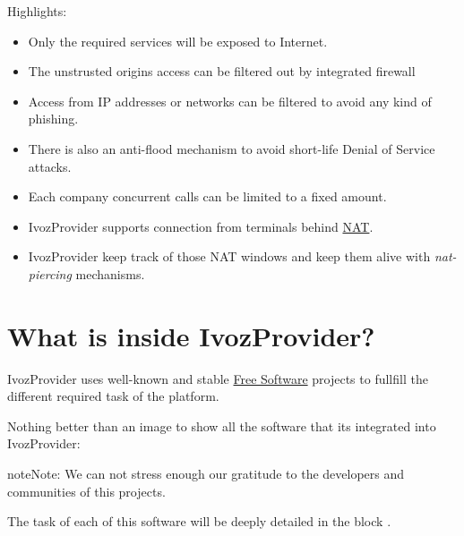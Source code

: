 \documentclass[letterpaper,10pt,english]{sphinxmanual}
\begin{document}
Highlights:
\begin{itemize}
\item {} 
Only the required services will be exposed to Internet.

\item {} 
The unstrusted origins access can be filtered out by integrated firewall

\item {} 
Access from IP addresses or networks can be filtered to avoid any kind of
phishing.

\item {} 
There is also an anti-flood mechanism to avoid short-life Denial of
Service attacks.

\item {} 
Each company concurrent calls can be limited to a fixed amount.

\item {} 
IvozProvider supports connection from terminals behind
\href{https://es.wikipedia.org/wiki/Traducci\%C3\%B3n\_de\_direcciones\_de\_red}{NAT}.

\item {} 
IvozProvider keep track of those NAT windows and keep them alive with
\emph{nat-piercing} mechanisms.

\end{itemize}


\section{What is inside IvozProvider?}
\label{basics/intro/what_is_inside::doc}\label{basics/intro/what_is_inside:what-is-inside-ivozprovider}
IvozProvider uses well-known and stable \href{https://www.gnu.org/philosophy/free-sw.en.html}{Free Software} projects to fullfill
the different required task of the platform.

Nothing better than an image to show all the software that its integrated
into IvozProvider:


\begin{notice}{note}{Note:}
We can not stress enough our gratitude to the developers and communities
of this projects.
\end{notice}

The task of each of this software will be deeply detailed in the block
{\hyperref[basics/architecture/index:architecture]{}}.
\end{document}

